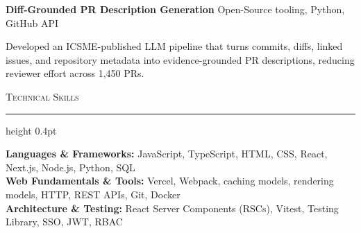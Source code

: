\documentclass[letterpaper,11pt]{article}
\newcommand{\resumesection}[1]{%
  \par\vspace{2pt}%
  {\large\scshape #1}\par\vspace{2pt}%
  \hrule height 0.4pt\vspace{2pt}%
}
\newcommand{\projectHeading}[2]{
  \textbf{#1} \hfill #2
}
\begin{document}
\projectHeading{Diff-Grounded PR Description Generation}{Open-Source tooling, Python, GitHub API}
\begin{tightitemize}
  \item Developed an ICSME-published LLM pipeline that turns commits, diffs, linked issues, and repository metadata into evidence-grounded PR descriptions, reducing reviewer effort across 1,450 PRs.
\end{tightitemize}

\resumesection{Technical Skills}
\textbf{Languages \& Frameworks:} JavaScript, TypeScript, HTML, CSS, React, Next.js, Node.js, Python, SQL\\
\textbf{Web Fundamentals \& Tools:} Vercel, Webpack, caching models, rendering models, HTTP, REST APIs, Git, Docker\\
\textbf{Architecture \& Testing:} React Server Components (RSCs), Vitest, Testing Library, SSO, JWT, RBAC
\end{document}

